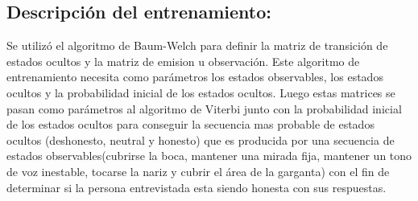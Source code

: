 \documentclass[11pt]{article}
\begin{document}
    \hypertarget{descripciuxf3n-del-entrenamiento}{%
\subsection{Descripción del
entrenamiento:}\label{descripciuxf3n-del-entrenamiento}}

    Se utilizó el algoritmo de Baum-Welch para definir la matriz de
transición de estados ocultos y la matriz de emision u observación. Este
algoritmo de entrenamiento necesita como parámetros los estados
observables, los estados ocultos y la probabilidad inicial de los
estados ocultos. Luego estas matrices se pasan como parámetros al
algoritmo de Viterbi junto con la probabilidad inicial de los estados
ocultos para conseguir la secuencia mas probable de estados ocultos
(deshonesto, neutral y honesto) que es producida por una secuencia de
estados observables(cubrirse la boca, mantener una mirada fija, mantener
un tono de voz inestable, tocarse la nariz y cubrir el área de la
garganta) con el fin de determinar si la persona entrevistada esta
siendo honesta con sus respuestas.
\end{document}
